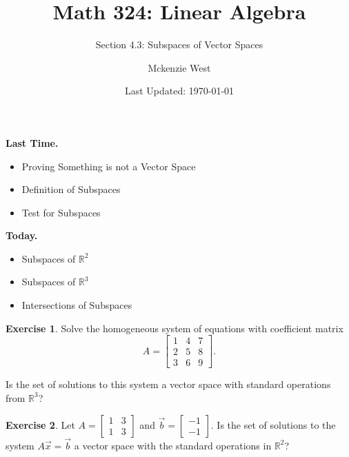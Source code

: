 \documentclass{beamer}
\newcommand{\R}{\mathbb{R}}
\newcommand{\fn}{\insertframenumber}
\theoremstyle{definition}
\newtheorem{exercise}{Exercise}
\begin{document}
	\title{Math 324: Linear Algebra}
	\subtitle{Section 4.3: Subspaces of Vector Spaces}
	\author{Mckenzie West}
	\date{Last Updated: \today}
\begin{frame}
\maketitle
\end{frame}

\begin{frame}{\insertframenumber}
	\begin{block}{\textbf{Last Time.}}
	\begin{itemize}[label=--]
		\item Proving Something is not a Vector Space
		\item Definition of Subspaces
		\item Test for Subspaces
	\end{itemize}
	\end{block}
	\begin{block}{\textbf{Today.}}
		\begin{itemize}[label=--]
			\item Subspaces of $\R^2$
			\item Subspaces of $\R^3$
			\item Intersections of Subspaces
		\end{itemize}
	\end{block}
\end{frame}
\begin{frame}{\fn}
	\begin{exercise}
		Solve the homogeneous system of equations with coefficient matrix \[A=\begin{bmatrix}1&4&7\\2&5&8\\3&6&9\end{bmatrix}.\]
	
	Is the set of solutions to this system a vector space with standard operations from $\R^3$?
	\end{exercise}
	\begin{exercise}
		Let $A=\begin{bmatrix}1&3\\1&3\end{bmatrix}$ and $\vec b=\begin{bmatrix}-1\\-1\end{bmatrix}$.  Is the set of solutions to the system $A\vec x=\vec b$ a vector space with the standard operations in $\R^2$?
	\end{exercise}
\end{frame}
\end{document}
